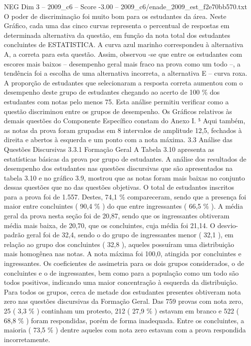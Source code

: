 \begin{textsample}{NEG Dim 3 – 2009\_c6 – Score -3.00 – 2009\_c6/enade\_2009\_est\_f2e70bb570.txt}
O poder de discriminação foi muito bom para os estudantes da área.
Neste Gráfico, cada uma das cinco curvas representa o percentual de respostas em determinada alternativa da questão, em função da nota total dos estudantes concluintes de ESTATISTICA.
A curva azul marinho correspondeu à alternativa A, a correta para esta questão.
Assim, observou -se que entre os estudantes com escores mais baixos – desempenho geral mais fraco na prova como um todo –, a tendência foi a escolha de uma alternativa incorreta, a alternativa E – curva roxa.
A proporção de estudantes que selecionaram a resposta correta aumentou com o desempenho deste grupo de estudantes chegando ao acerto de 100 \% dos estudantes com notas pelo menos 75.
Esta análise permitiu verificar como a questão discriminou entre os grupos de desempenho.
Os Gráficos relativos às demais questões do Componente Específico constam do Anexo I. ⁵ Aqui também, as notas da prova foram grupadas em 8 intervalos de amplitude 12,5, fechados à direita e abertos à esquerda e um ponto com a nota máxima. 3.3 Análise das Questões Discursivas 3.3.1 Formação Geral A Tabela 3.10 apresenta as estatísticas básicas da prova por grupo de estudantes.
A análise dos resultados de desempenho dos estudantes nas questões discursivas que são apresentados na tabela 3.10 e no gráfico 3.9, mostrou que as notas foram mais baixas no conjunto dessas questões que no das questões objetivas.
O total de estudantes inscritos para a prova foi de 1.557.
Destes, 74,1 \% compareceram, sendo que a presença foi maior entre concluintes ( 90,4 \% ) do que entre ingressantes ( 66,5 \% ).
A média geral da prova nesta seção foi de 20,87, sendo que os ingressantes obtiveram média mais baixa, de 20,70, que os concluintes, cuja média foi 21,14.
O desvio-padrão geral foi de 32,4, sendo o do grupo de ingressantes menor ( 32,1 ), em relação ao grupo dos concluintes ( 32,8 ), aqueles possuíram uma distribuição mais homogênea nas notas.
A nota máxima foi 100,0, atingida por concluintes e ingressantes.
Os coeficientes de assimetria para os dois grupos considerados, o de concluintes e o de ingressantes, bem como para a população como um todo são todos positivos, indicando uma maior concentração à esquerda da distribuição.
Para todos os grupos, cerca de metade dos estudantes presentes obtiveram nota zero nas questões discursivas da Formação Geral.
Das 759 provas com nota zero, 25 ( 3,3 \% ) continham um protesto, 212 ( 27,9 \% ) estavam em branco e 522 ( 68,8 \% ) foram respondidas, porém de forma inadequada.
Entre os concluintes, a maioria ( 73,5 \% ) dentre aqueles com nota zero estavam com a prova respondida incorretamente.

\end{textsample}
